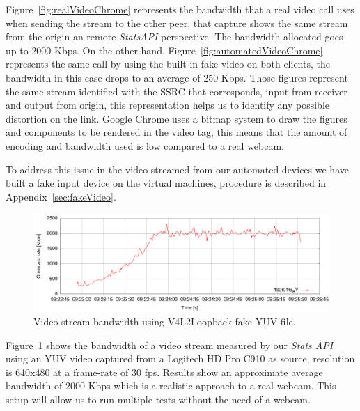 Figure~\ref{fig:realVideoChrome} represents the bandwidth that a real video call uses when sending the stream to the other peer, that capture shows the same stream from the origin an remote {\it StatsAPI} perspective. The bandwidth allocated goes up to 2000 Kbps. On the other hand, Figure~\ref{fig:automatedVideoChrome} represents the same call by using the built-in fake video on both clients, the bandwidth in this case drops to an average of 250 Kbps. Those figures represent the same stream identified with the SSRC that corresponds, input from receiver and output from origin, this representation helps us to identify any possible distortion on the link. Google Chrome uses a bitmap system to draw the figures and components to be rendered in the video tag, this means that the amount of encoding and bandwidth used is low compared to a real webcam.

To address this issue in the video streamed from our automated devices we have built a fake input device on the virtual machines, procedure is described in Appendix~\ref{sec:fakeVideo}.

 \begin{figure}[h]
  \centering
    \includegraphics[width=1\textwidth]{./figures/testV4L2niklas.pdf}
      \caption[Video stream bandwidth using V4L2Loopback fake YUV file]{Video stream bandwidth using V4L2Loopback fake YUV file.}
	\label{fig:testV4L2niklas}
\end{figure}

Figure~\ref{fig:testV4L2niklas} shows the bandwidth of a video stream measured by our {\it Stats API} using an YUV video captured from a Logitech HD Pro C910 as source, resolution is 640x480 at a frame-rate of 30 fps. Results show an approximate average bandwidth of 2000 Kbps which is a realistic approach to a real webcam. This setup will allow us to run multiple tests without the need of a webcam.